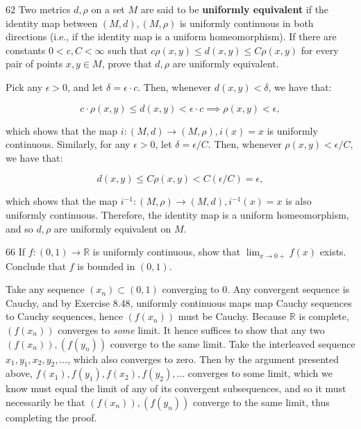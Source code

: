 \begin{exercise}{62}
    Two metrics $d, \rho$ on a set $M$ are said to be \textbf{uniformly equivalent} if the identity map between $(M, d), (M, \rho)$ is uniformly continuous in both directions (i.e., if the identity map is a uniform homeomorphism).
    If there are constants $0 < c, C < \infty$ such that $c\rho(x, y) \leq d(x, y) \leq C\rho(x, y)$ for every pair of points $x, y \in M$, prove that $d, \rho$ are uniformly equivalent.
\end{exercise}

\begin{solution}
    
    Pick any $\epsilon > 0$, and let $\delta = \epsilon \cdot c$.
    Then, whenever $d(x, y) < \delta$, we have that:

    \[c \cdot \rho(x, y) \leq d(x, y) < \epsilon \cdot c \implies \rho(x, y) < \epsilon,\]

    which shows that the map $i: (M, d) \rightarrow (M, \rho), i(x) = x$ is uniformly continuous.
    Similarly, for any $\epsilon > 0$, let $\delta = \epsilon/C$.
    Then, whenever $\rho(x, y) < \epsilon/C$, we have that:

    \[d(x, y) \leq C \rho(x, y) < C(\epsilon/C) = \epsilon,\]

    which shows that the map $i^{-1}: (M, \rho) \rightarrow (M, d), i^{-1}(x) = x$ is also uniformly continuous.
    Therefore, the identity map is a uniform homeomorphism, and so $d, \rho$ are uniformly equivalent on $M$.
\end{solution}

\begin{exercise}{66}
    If $f: (0, 1) \rightarrow \mathbb{R}$ is uniformly continuous, show that $\lim_{x \rightarrow 0+} f(x)$ exists.
    Conclude that $f$ is bounded in $(0, 1)$.
\end{exercise}

\begin{solution}

    Take any sequence $(x_n) \subset (0, 1)$ converging to 0.
    Any convergent sequence is Cauchy, and by Exercise 8.48, uniformly continuous maps map Cauchy sequences  to Cauchy sequences, hence $(f(x_n))$ must be Cauchy.
    Because $\mathbb{R}$ is complete, $(f(x_n))$ converges to \textit{some} limit.
    It hence suffices to show that any two $(f(x_n)), (f(y_n))$ converge to the same limit.
    Take the interleaved sequence $x_1, y_1, x_2, y_2, \ldots$, which also converges to zero.
    Then by the argument presented above, $f(x_1), f(y_1), f(x_2), f(y_2), \ldots$ converges to some limit, which we know must equal the limit of any of its convergent subsequences, and so it must necessarily be that $(f(x_n)), (f(y_n))$ converge to the same limit, thus completing the proof.
\end{solution}

